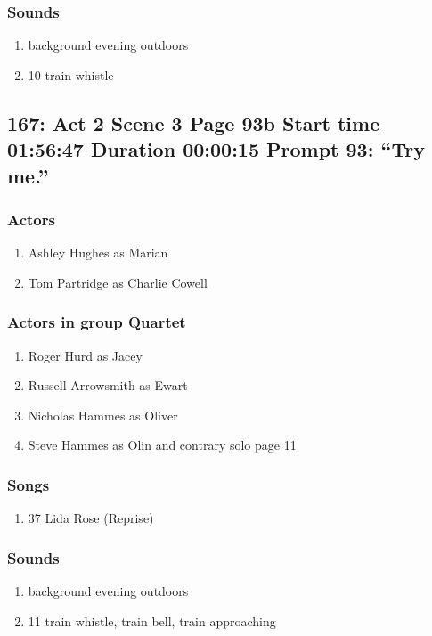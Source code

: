 \subsubsection{Sounds}
\begin{enumerate}
\item background evening outdoors
\item 10 train whistle
\end{enumerate}
\subsection{167: Act 2 Scene 3 Page 93b Start time 01:56:47 Duration 00:00:15 Prompt 93: ``Try me.''}

\subsubsection{Actors}
\begin{enumerate}
\item Ashley Hughes as Marian
\item Tom Partridge as Charlie Cowell
\end{enumerate}
\subsubsection{Actors in group Quartet}
\begin{enumerate}
\item Roger Hurd as Jacey
\item Russell Arrowsmith as Ewart
\item Nicholas Hammes as Oliver
\item Steve Hammes as Olin and contrary solo page 11
\end{enumerate}

\subsubsection{Songs}
\begin{enumerate}
\item 37 Lida Rose (Reprise)
\end{enumerate}\subsubsection{Sounds}
\begin{enumerate}
\item background evening outdoors
\item 11 train whistle, train bell, train approaching
\end{enumerate}
